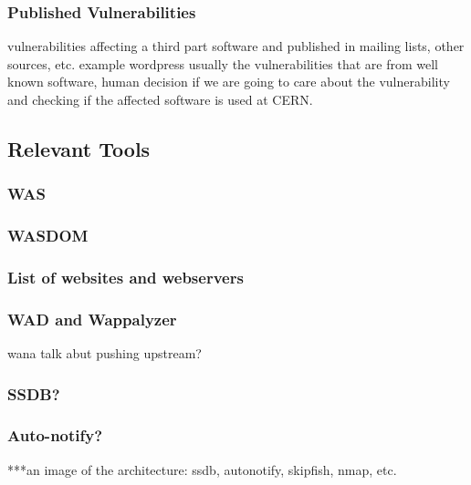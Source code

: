 \subsubsection{Published Vulnerabilities}
vulnerabilities affecting a third part software and published in mailing lists, other sources, etc. example wordpress
usually the vulnerabilities that are from well known software, human decision if we are going to care about the vulnerability and checking if the affected software is used at CERN.

\subsection{Relevant Tools}
\label{sec:tools}
\subsubsection{WAS}
\subsubsection{WASDOM}
\subsubsection{List of websites and webservers}
\subsubsection{WAD and Wappalyzer}
\label{wad_section}
wana talk abut pushing upstream?
\subsubsection{SSDB?}
\subsubsection{Auto-notify?}

***an image of the architecture: ssdb, autonotify, skipfish, nmap, etc.


